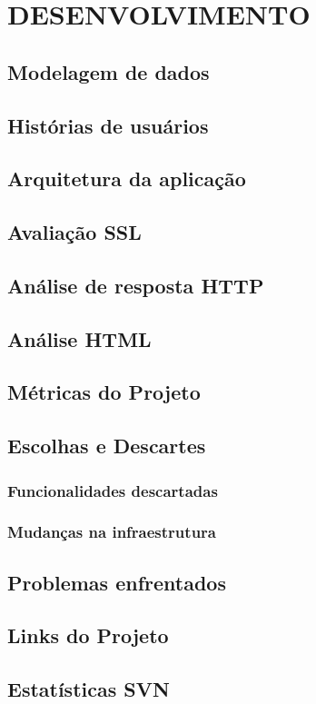 \chapter{DESENVOLVIMENTO}

	\section{Modelagem de dados}
	\section{Histórias de usuários}
	\section{Arquitetura da aplicação}
	\section{Avaliação SSL}
	\section{Análise de resposta HTTP}
	\section{Análise HTML}
	\section{Métricas do Projeto}
	\section{Escolhas e Descartes}
	\subsection{Funcionalidades descartadas}
	\subsection{Mudanças na infraestrutura}
	\section{Problemas enfrentados}
	\section{Links do Projeto}
	\section{Estatísticas SVN}